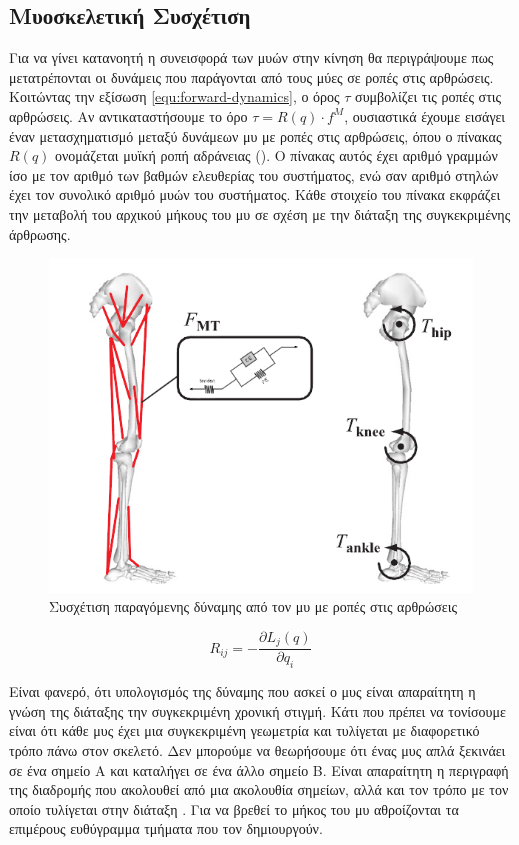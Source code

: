 \subsection{Μυοσκελετική Συσχέτιση}

Για να γίνει κατανοητή η συνεισφορά των μυών στην κίνηση θα περιγράψουμε πως μετατρέπονται οι δυνάμεις που παράγονται από τους μύες σε ροπές στις αρθρώσεις. Κοιτώντας την εξίσωση \ref{equ:forward-dynamics}, ο όρος $\tau$ συμβολίζει τις ροπές στις αρθρώσεις. Αν αντικαταστήσουμε το όρο $\tau = R(q) \cdot f^{M}$, ουσιαστικά έχουμε εισάγει έναν μετασχηματισμό μεταξύ δυνάμεων μυ με ροπές στις αρθρώσεις, όπου ο πίνακας $R(q)$ ονομάζεται μυϊκή ροπή αδράνειας (). Ο πίνακας αυτός έχει αριθμό γραμμών ίσο με τον αριθμό των βαθμών ελευθερίας του συστήματος, ενώ σαν αριθμό στηλών έχει τον συνολικό αριθμό μυών του συστήματος. Κάθε στοιχείο του πίνακα εκφράζει την μεταβολή του αρχικού μήκους του μυ σε σχέση με την διάταξη της συγκεκριμένης άρθρωσης.

\begin{figure}[H]
    \centering
    \includegraphics[width=.6\textwidth, height=.30\textheight]{musculoskeletal/fig/muscle-skeleton-torque.png}
    \caption{Συσχέτιση παραγόμενης δύναμης από τον μυ με ροπές στις αρθρώσεις\cite{erdemir07}}
    \label{fig:force-torques}
\end{figure}

\begin{equation}
    R_{ij} = - \frac{\partial L_{j}(q)}{\partial q_{i}}
    \label{equ:muscle-moment-arm}
\end{equation}

Είναι φανερό, ότι υπολογισμός της δύναμης που ασκεί ο μυς είναι απαραίτητη η γνώση της διάταξης την συγκεκριμένη χρονική στιγμή. Κάτι που πρέπει να τονίσουμε είναι ότι κάθε μυς έχει μια συγκεκριμένη γεωμετρία και τυλίγεται με διαφορετικό τρόπο πάνω στον σκελετό. Δεν μπορούμε να θεωρήσουμε ότι ένας μυς απλά ξεκινάει σε ένα σημείο Α και καταλήγει σε ένα άλλο σημείο Β. Είναι απαραίτητη η περιγραφή της διαδρομής που ακολουθεί από μια ακολουθία σημείων, αλλά και τον τρόπο με τον οποίο τυλίγεται στην διάταξη \cite{delp95}. Για να βρεθεί το μήκος του μυ αθροίζονται τα επιμέρους ευθύγραμμα τμήματα που τον δημιουργούν.


